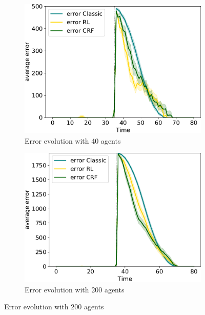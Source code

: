 \begin{figure}[t!]
  \begin{subfigure}[t]{\figfactor\textwidth}
    \centering
    \includegraphics[width=\textwidth]{papers/coordination2022/img/error-few-nodes.pdf}
    \caption{Error evolution with 40 agents}
    \label{coordination2022:subfig:error-few}
  \end{subfigure}
  \hfill
  \begin{subfigure}[t]{\figfactor\textwidth}
    \centering
    \includegraphics[width=\textwidth]{papers/coordination2022/img/error-many-nodes.pdf}
    \caption{Error evolution with 200 agents}
    \label{coordination2022:subfig:error-many}
  \end{subfigure}
  \bigskip
  

\end{figure}

